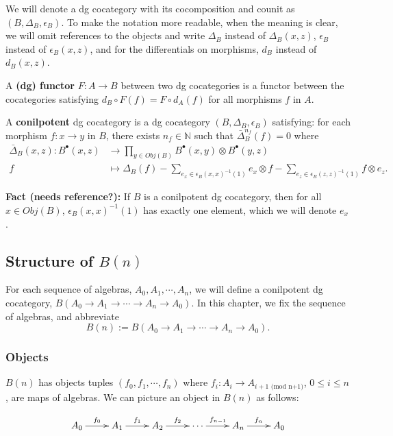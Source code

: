We will denote a dg cocategory with its 
cocomposition and counit as $(B, \Delta_B, 
\epsilon_B)$. To make the notation more 
readable, when the meaning is clear, 
we will omit references to the 
objects and write $\Delta_B$ instead of 
$\Delta_B(x,z)$, $\epsilon_B$ instead of 
$\epsilon_B(x,z)$, and for the differentials 
on morphisms, $d_B$ instead of $d_B(x,z)$.
%
\begin{defn} A \textbf{(dg) functor} $F: A \to B$ 
between two dg cocategories is a functor 
between the cocategories satisfying 
$d_B\circ F(f) = F\circ d_A(f)$ for all 
morphisms $f$ in $A$.
\end{defn}
%
\begin{defn} A \textbf{conilpotent} dg 
cocategory is a dg cocategory $(B, 
\Delta_B, \epsilon_B)$ satisfying: for each 
morphism $f:x\to y$ in $B$, there exists 
$n_f \in \mathbb{N}$ such that 
$\bar{\Delta}_B^{n_f}(f) = 0$
where
\begin{align*}
\bar{\Delta}_B(x,z): B^\bullet(x,z) 
&\to 
  \prod \limits_{y \in Obj(B)} 
  B^\bullet(x,y) \otimes
  B^\bullet(y,z)\\
f
&\mapsto
\Delta_B(f)
- \sum \limits_{e_x \in 
  \epsilon_B(x,x)^{-1}(1)}
  e_x \otimes f
- \sum \limits_{e_z \in 
  \epsilon_B(z,z)^{-1}(1)}
  f \otimes e_z. 
\end{align*}
\end{defn}
%
\textbf{Fact (needs reference?):} 
If $B$ is a conilpotent dg cocategory, 
then for all $x \in Obj(B)$, 
$\epsilon_B(x,x)^{-1}(1)$ has exactly 
one element, which we will denote $e_x$.
%
\subsection{Structure of $B(n)$}
For each sequence of algebras, 
$A_0, A_1, \cdots, A_n$, 
we will define a conilpotent dg cocategory, 
$B(A_0 \to A_1 \to \cdots \to A_n \to A_0)$. 
In this chapter, we fix the sequence of 
algebras, and abbreviate 
$$
B(n):= B(A_0 \to A_1 \to \cdots \to A_n \to A_0).
$$
%
\subsubsection{Objects}
$B(n)$ has objects tuples $(f_0, f_1, \cdots, f_n)$ where $f_i : A_i \to A_{i+1 \textrm{ (mod n+1)}}$, $0 \leq i \leq n$, are maps of algebras. We can picture an object in $B(n)$ as follows:

\begin{equation*}
\xymatrix{
A_0 \ar[r]^{f_0}
& A_1 \ar[r]^{f_1}
& A_2 \ar[r]^{f_2}
& \cdots \ar[r]^{f_{n-1}}
& A_n \ar[r]^{f_n}
& A_0
}
\end{equation*}


